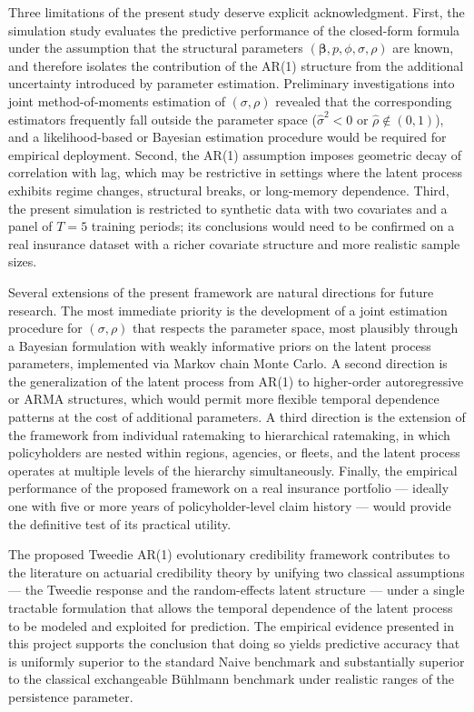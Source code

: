 \documentclass{sfuthesis}
\numberwithin{equation}{chapter}
\begin{document}
Three limitations of the present study deserve explicit acknowledgment.
First, the simulation study evaluates the predictive performance of the
closed-form formula under the assumption that the structural parameters
$(\bm{\beta}, p, \phi, \sigma, \rho)$ are known, and therefore isolates
the contribution of the AR(1) structure from the additional uncertainty
introduced by parameter estimation. Preliminary investigations into
joint method-of-moments estimation of $(\sigma, \rho)$ revealed that
the corresponding estimators frequently fall outside the parameter
space ($\hat{\sigma}^2 < 0$ or $\hat{\rho} \notin (0, 1)$), and a
likelihood-based or Bayesian estimation procedure would be required for
empirical deployment. Second, the AR(1) assumption imposes geometric
decay of correlation with lag, which may be restrictive in settings
where the latent process exhibits regime changes, structural breaks, or
long-memory dependence. Third, the present simulation is restricted to
synthetic data with two covariates and a panel of $T = 5$ training
periods; its conclusions would need to be confirmed on a real
insurance dataset with a richer covariate structure and more realistic
sample sizes.


Several extensions of the present framework are natural directions for
future research. The most immediate priority is the development of a
joint estimation procedure for $(\sigma, \rho)$ that respects the
parameter space, most plausibly through a Bayesian formulation with
weakly informative priors on the latent process parameters, implemented
via Markov chain Monte Carlo. A second direction is the generalization
of the latent process from AR(1) to higher-order autoregressive or
ARMA structures, which would permit more flexible temporal dependence
patterns at the cost of additional parameters. A third direction is the
extension of the framework from individual ratemaking to hierarchical
ratemaking, in which policyholders are nested within regions, agencies,
or fleets, and the latent process operates at multiple levels of the
hierarchy simultaneously. Finally, the empirical performance of the
proposed framework on a real insurance portfolio --- ideally one with
five or more years of policyholder-level claim history --- would
provide the definitive test of its practical utility.

The proposed Tweedie AR(1) evolutionary credibility framework
contributes to the literature on actuarial credibility theory by
unifying two classical assumptions --- the Tweedie response and the
random-effects latent structure --- under a single tractable
formulation that allows the temporal dependence of the latent process
to be modeled and exploited for prediction. The empirical evidence
presented in this project supports the conclusion that doing so yields
predictive accuracy that is uniformly superior to the standard Naive
benchmark and substantially superior to the classical exchangeable
Bühlmann benchmark under realistic ranges of the persistence parameter. 
\end{document}
